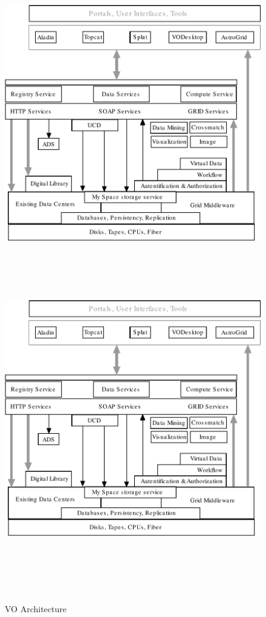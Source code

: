     \begin{figure}[!htbp]
      \begin{center}
        \leavevmode
        \ifpdf
        \includegraphics[scale = .8]{architecture}
        \else
        \includegraphics[bb = 92 86 545 742, height=6in]{architecture}
        \fi
      \end{center}
        \caption{VO Architecture}
        \label{FigArchitecture}
    \end{figure}

